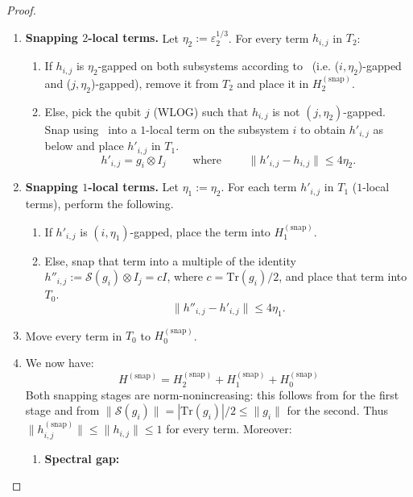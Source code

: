 \documentclass[a4paper,onecolumn,11pt]{quantumarticle}
\theoremstyle{plain}
\newcommand{\eps}{\varepsilon}
\newcommand{\snp}{{(\mathrm{snap})}}
\begin{document}
\begin{proof}
\begin{enumerate}
    Let $\eps_2 = \eps$.
    \item \textbf{Snapping $2$-local terms.} Let $\eta_2 := \eps_2^{1/3}$. For every term $h_{i, j}$ in $T_2$:
    \begin{enumerate}
        \item If $h_{i, j}$ is $\eta_2$-gapped on both subsystems according to~ (i.e. ($i, \eta_2$)-gapped and ($j, \eta_2$)-gapped), remove it from $T_2$ and place it in $H^\snp_2$.
        \item Else, pick the qubit $j$ (WLOG) such that $h_{i, j}$ is not $(j, \eta_2)$-gapped. Snap using~ into a $1$-local term on the subsystem $i$ to obtain $h'_{i,j}$ as below and place $h'_{i,j}$ in $T_1$.
        \begin{equation}
        h'_{i,j} = g_i \otimes I_j  \quad\quad \text{ where }\quad\quad     \| h'_{i,j} - h_{i,j} \| \leq 4\eta_2.
        \end{equation}
    \end{enumerate}
    \item \textbf{Snapping $1$-local terms.} Let $\eta_1 := \eta_2$. For each term $h'_{i,j}$ in $T_1$ ($1$-local terms), perform the following.
    \begin{enumerate}
        \item If $h'_{i,j}$ is $(i, \eta_1)$-gapped, place the term into $H^\snp_1$.
        \item Else, snap that term into a multiple of the identity $h''_{i,j} := \mathcal{S}(g_i)\otimes I_j = c I$, where $c=\mathrm{Tr}(g_i)/2$, and place that term into $T_0$.
        \begin{equation}
            \|h''_{i,j} - h'_{i,j}\| \leq 4 \eta_1.
        \end{equation}
    \end{enumerate}
    \item Move every term in $T_0$ to $H^\snp_0$.
    \item We now have:
    \begin{equation}
        H^\snp = H^\snp_2 + H^\snp_1 + H^\snp_0
    \end{equation}
    Both snapping stages are norm-nonincreasing: this follows from  for the first stage and from $\|\mathcal{S}(g_i)\|=|\mathrm{Tr}(g_i)|/2\leq\|g_i\|$ for the second. Thus $\|h^\snp_{i,j}\|\leq\|h_{i,j}\|\leq 1$ for every term. Moreover:
    \begin{enumerate}
    \item \textbf{Spectral gap:}

\end{enumerate}
\end{enumerate}
\end{proof}
\end{document}
